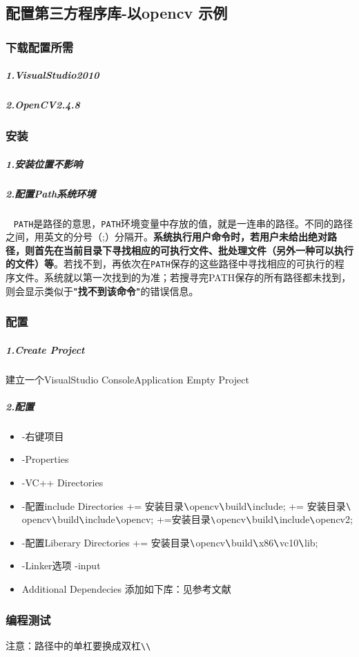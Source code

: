 \documentclass[UTF8,a4paper,12pt]{ctexbook} %
\begin{document}
		\subsection{配置第三方程序库-以opencv 示例}
			\subsubsection{下载配置所需}
				\subparagraph{1.VisualStudio2010}
				\subparagraph{2.OpenCV2.4.8}
			
			\subsubsection{安装}
				\subparagraph{1.安装位置不影响}
				\subparagraph{2.配置Path系统环境}	
				  \verb|PATH|是路径的意思，\verb|PATH|环境变量中存放的值，就是一连串的路径。不同的路径之间，用英文的分号（;）分隔开。\textbf{系统执行用户命令时，若用户未给出绝对路径，则首先在当前目录下寻找相应的可执行文件、批处理文件（另外一种可以执行的文件）等}。若找不到，再依次在\verb|PATH|保存的这些路径中寻找相应的可执行的程序文件。系统就以第一次找到的为准；若搜寻完PATH保存的所有路径都未找到，则会显示类似于\textbf{"找不到该命令"}的错误信息。
			
			\subsubsection{配置}
				\subparagraph{1.Create Project}建立一个VisualStudio  ConsoleApplication Empty Project
				\subparagraph{2.配置}
				\begin{itemize}[itemindent = 2em]
					\item -右键项目
					\item -Properties
					\item -VC++ Directories
					\item -配置include Directories += 安装目录$ \verb|\|$opencv$ \verb|\|$build$ \verb|\|$include; += 安装目录$ \verb|\|$ opencv$ \verb|\|$build$ \verb|\|$include$ \verb|\|$opencv; +=安装目录$ \verb|\|$opencv$ \verb|\|$build$ \verb|\|$include$ \verb|\|$opencv2;
					\item -配置Liberary Directories += 安装目录$ \verb|\|$opencv$ \verb|\|$build$ \verb|\|$x86$ \verb|\|$vc10$ \verb|\|$lib;
					\item -Linker选项 -input
					\item Additional Dependecies 添加如下库：见参考文献
				\end{itemize}
			
			\subsubsection{编程测试}注意：路径中的单杠要换成双杠\verb|\\|
			
\end{document}
